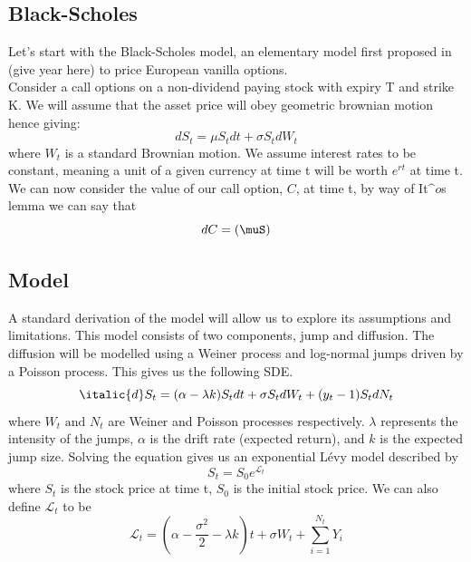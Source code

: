 \documentclass[12pt]{article}
\numberwithin{equation}{section}
\begin{document}
\subsection{Black-Scholes}
Let's start with the Black-Scholes model, an elementary model first proposed in 
(give year here) to price European vanilla options. \\
Consider a call options on a non-dividend paying stock with expiry T and strike K. 
We will assume that the asset price will obey geometric brownian motion hence 
giving: 
\begin{equation}
dS_t = \mu {S_t} dt + \sigma S_t dW_t
\end{equation}
where $W_t$ is a standard Brownian motion. We assume interest rates to be constant,
meaning a unit of a given currency at time t will be worth $e^{rt}$ at time t.\\
We can now consider the value of our call option, $C$, at time t, by way of It$\^{o}$s 
lemma
we can say that 
\begin{equation}
dC = (\muS)
\end{equation}
\subsection{Model}
A standard derivation of the model will allow us to explore its assumptions and 
limitations. This model consists of two components, jump and diffusion. The 
diffusion will be modelled using a Weiner process and log-normal jumps driven 
by a Poisson process. This gives us the following
SDE. 
\begin{equation}
  \italic{d}S_t = (\alpha - \lambda k)S_tdt + \sigma S_t dW_t + (y_t-1)S_tdN_t
\end{equation}
where $W_t \text{ and } N_t$ are Weiner and Poisson processes respectively. 
$\lambda$ represents the intensity of the jumps, $\alpha$ is the drift rate
(expected return), and $k$ is the expected jump size. 
Solving the equation gives us an exponential L\'{e}vy model described by 
\begin{equation}
  S_t = S_0e^{\mathcal{L}_t}
\end{equation}
where $S_t$ is the stock price at time t, $S_0$ is the initial stock price. 
We can also define $\mathcal{L}_t$ to be 
\begin{equation}
  \mathcal{L}_t = (\alpha - \frac{\sigma^2}{2}-\lambda k)t + \sigma W_t + 
  \sum^{N_t}_{i=1}Y_i
\end{equation}
\end{document}
